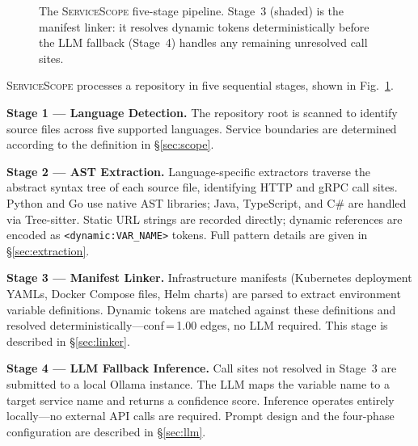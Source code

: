 \documentclass[runningheads]{llncs}
\begin{document}
\begin{figure}[t]
\caption{The \textsc{ServiceScope} five-stage pipeline. Stage~3
  (shaded) is the manifest linker: it resolves dynamic tokens
  deterministically before the LLM fallback (Stage~4) handles
  any remaining unresolved call sites.}
\label{fig:pipeline}
\end{figure}

\textsc{ServiceScope} processes a repository in five sequential stages,
shown in Fig.~\ref{fig:pipeline}.

\textbf{Stage 1 --- Language Detection.} The repository root is scanned
to identify source files across five supported languages. Service boundaries
are determined according to the definition in \S\ref{sec:scope}.

\textbf{Stage 2 --- AST Extraction.} Language-specific extractors traverse
the abstract syntax tree of each source file, identifying HTTP and gRPC
call sites. Python and Go use native AST libraries; Java, TypeScript, and
C\# are handled via Tree-sitter. Static URL strings are recorded directly;
dynamic references are encoded as \texttt{<dynamic:VAR\_NAME>} tokens.
Full pattern details are given in \S\ref{sec:extraction}.

\textbf{Stage 3 --- Manifest Linker.} Infrastructure manifests (Kubernetes
deployment YAMLs, Docker Compose files, Helm charts) are parsed to extract
environment variable definitions. Dynamic tokens are matched against these
definitions and resolved deterministically---conf\,=\,1.00 edges, no LLM
required. This stage is described in \S\ref{sec:linker}.

\textbf{Stage 4 --- LLM Fallback Inference.} Call sites not resolved in
Stage~3 are submitted to a local Ollama instance. The LLM maps the variable
name to a target service name and returns a confidence score. Inference
operates entirely locally---no external API calls are required. Prompt design
and the four-phase configuration are described in \S\ref{sec:llm}.
\end{document}
